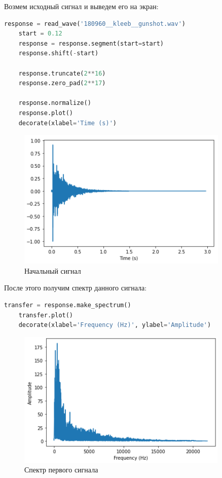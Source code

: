 \documentclass[a4paper]{article}
\begin{document}
            Возмем исходный сигнал и выведем его на экран:
            
\begin{lstlisting}[language=Python, caption= Получение сигнала]
    response = read_wave('180960__kleeb__gunshot.wav')
    start = 0.12
    response = response.segment(start=start)
    response.shift(-start)
    
    response.truncate(2**16)
    response.zero_pad(2**17)
    
    response.normalize()
    response.plot()
    decorate(xlabel='Time (s)')
\end{lstlisting}
            
            \begin{figure}[H]
                \centering
                \includegraphics{ex_1_1.png}
                \caption{Начальный сигнал}
                \label{fig:ex_1_1}
            \end{figure}
            
            После этого получим спектр данного сигнала:
            
\begin{lstlisting}[language=Python, caption= Получение спектра первого сигнала]
    transfer = response.make_spectrum()
    transfer.plot()
    decorate(xlabel='Frequency (Hz)', ylabel='Amplitude')
\end{lstlisting}
            
            \begin{figure}[H]
                \centering
                \includegraphics{ex_1_2.png}
                \caption{Спектр первого сигнала}
                \label{fig:ex_1_2}
            \end{figure}
            
\end{document}
